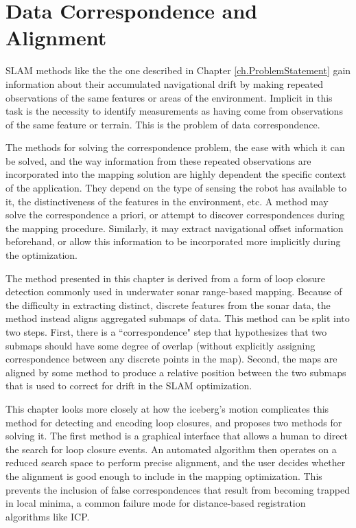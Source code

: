 
\chapter{Data Correspondence and Alignment}
\label{ch.LoopClosure}

SLAM methods like the the one described in Chapter \ref{ch.ProblemStatement} gain information about their accumulated navigational drift by making repeated observations of the same features or areas of the environment. Implicit in this task is the necessity to identify measurements as having come from observations of the same feature or terrain. This is the problem of data correspondence. 

The methods for solving the correspondence problem, the ease with which it can be solved, and the way information from these repeated observations are incorporated into the mapping solution are highly dependent the specific context of the application. They depend on the type of sensing the robot has available to it, the distinctiveness of the features in the environment, etc. A method may solve the correspondence a priori, or attempt to discover correspondences during the mapping procedure. Similarly, it may extract navigational offset information beforehand, or allow this information to be incorporated more implicitly during the optimization.

The method presented in this chapter is derived from a form of loop closure detection commonly used in underwater sonar range-based mapping. Because of the difficulty in extracting distinct, discrete features from the sonar data, the method instead aligns aggregated submaps of data. This method can be split into two steps. First, there is a ``correspondence" step that hypothesizes that two submaps should have some degree of overlap (without explicitly assigning correspondence between any discrete points in the map). Second, the maps are aligned by some method to produce a relative position between the two submaps that is used to correct for drift in the SLAM optimization. 

This chapter looks more closely at how the iceberg's motion complicates this method for detecting and encoding loop closures, and proposes two methods for solving it. The first method is a graphical interface that allows a human to direct the search for loop closure events. An automated algorithm then operates on a reduced search space to perform precise alignment, and the user decides whether the alignment is good enough to include in the mapping optimization. This prevents the inclusion of false correspondences that result from becoming trapped in local minima, a common failure mode for distance-based registration algorithms like ICP.

